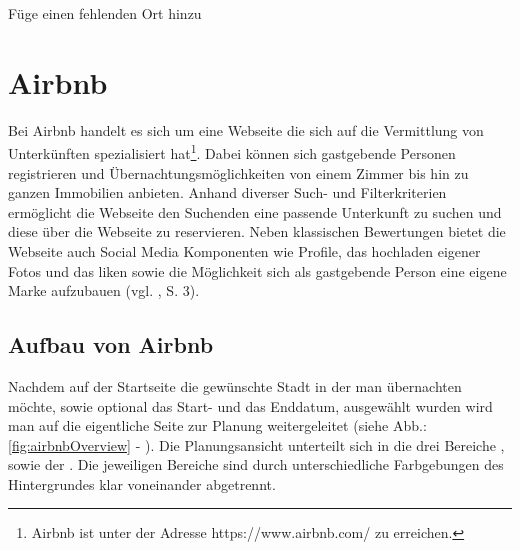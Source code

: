\documentclass[../Bachelorarbeit.tex]{subfiles}
\begin{document}
Füge einen fehlenden Ort hinzu

\section{Airbnb}
\label{Airbnb}
Bei Airbnb handelt es sich um eine Webseite die sich auf die Vermittlung von Unterkünften spezialisiert hat\footnote{
	Airbnb ist unter der Adresse https://www.airbnb.com/ zu erreichen.
	}. 
Dabei können sich gastgebende Personen registrieren und Übernachtungsmöglichkeiten von einem Zimmer bis hin zu ganzen Immobilien anbieten. 
Anhand diverser Such- und Filterkriterien ermöglicht die Webseite den Suchenden eine passende Unterkunft zu suchen und diese über die Webseite zu reservieren.
Neben klassischen Bewertungen bietet die Webseite auch Social Media Komponenten wie Profile, das hochladen eigener Fotos und das liken  sowie die Möglichkeit sich als gastgebende Person eine eigene Marke aufzubauen (vgl. \cite{Yannopoulou2013}, S. 3).

\subsection{Aufbau von Airbnb}
Nachdem auf der Startseite die gewünschte Stadt in der man übernachten möchte, sowie optional das Start- und das Enddatum, ausgewählt wurden wird man auf die eigentliche Seite zur Planung weitergeleitet (siehe Abb.: \ref{fig:airbnbOverview} - ).
Die Planungsansicht unterteilt sich in die drei Bereiche ,  sowie der .
Die jeweiligen Bereiche sind durch unterschiedliche Farbgebungen des Hintergrundes klar voneinander abgetrennt.
\end{document}
